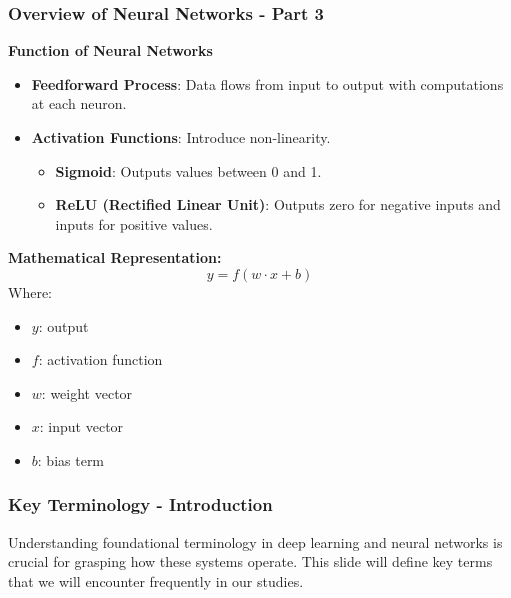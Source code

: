 \documentclass[aspectratio=169]{beamer}
\begin{document}
\begin{frame}[fragile]
    \frametitle{Overview of Neural Networks - Part 3}
    
    \textbf{Function of Neural Networks}
    
    \begin{itemize}
        \item \textbf{Feedforward Process}: Data flows from input to output with computations at each neuron.
        \item \textbf{Activation Functions}: Introduce non-linearity.
            \begin{itemize}
                \item \textbf{Sigmoid}: Outputs values between 0 and 1.
                \item \textbf{ReLU (Rectified Linear Unit)}: Outputs zero for negative inputs and inputs for positive values.
            \end{itemize}
    \end{itemize}
    
    \textbf{Mathematical Representation:}
    \begin{equation}
    y = f(w \cdot x + b)
    \end{equation}
    Where:
    \begin{itemize}
        \item $y$: output
        \item $f$: activation function
        \item $w$: weight vector
        \item $x$: input vector
        \item $b$: bias term
    \end{itemize}
\end{frame}

\begin{frame}[fragile]
    \frametitle{Key Terminology - Introduction}
    Understanding foundational terminology in deep learning and neural networks is crucial for grasping how these systems operate. This slide will define key terms that we will encounter frequently in our studies.
\end{frame}
\end{document}
